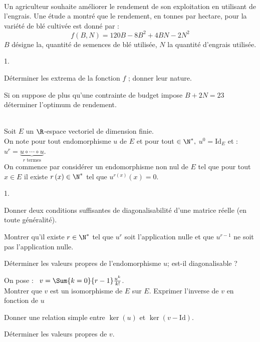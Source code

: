 \documentclass[11pt]{article}%
\begin{document}
\begin{exerciceSP}~\\
  Un agriculteur souhaite améliorer le rendement de son exploitation
  en utilisant de l'engrais. Une étude a montré que le rendement, en
  tonnes par hectare, pour la variété de blé cultivée est donné par :
  \[
  f\left( B,N\right) =120B-8B^{2}+4BN-2N^{2}
  \]
  $B$ désigne la, quantité de semences de blé utilisée, $N$ la
  quantité d'engrais utilisée.
  \begin{noliste}{1.}
    \setlength{\itemsep}{2mm}
  \item Déterminer les extrema de la fonction $f$ ; donner leur
    nature.
  \item Si on suppose de plus qu'une contrainte de budget impose
    $B+2N=23$ déterminer l'optimum de rendement.
  \end{noliste}
\end{exerciceSP}


\newpage


\begin{exerciceAP}~\\
  Soit $E$ un $\R$-espace vectoriel de dimension finie.\\
  On note pour tout endomorphisme $u$ de $E$ et pour tout $\in
  \N^{\ast },$ $u^{0}= \mathrm{Id}_{E}$ et : \
  $u^{r} = \underset{r\text{ termes}}{\underbrace{u\circ \cdots \circ
      u}}$.\\[.2cm]
  On commence par considérer un endomorphisme non nul de $E$ tel que
  pour tout $x\in E$ il existe $r\left( x\right) \in \N^{\ast }$ tel
  que $u^{r\left( x\right) }(x) = 0$.
  \begin{noliste}{1.}
    \setlength{\itemsep}{2mm}
  \item Donner deux conditions suffisantes de diagonalisabilité d'une
    matrice réelle (en toute généralité).

  \item Montrer qu'il existe $r\in \N^{\ast }$ tel que $u^{r}$ soit
    l'application nulle et que $u^{r-1}$ ne soit pas l'application
    nulle.

  \item Déterminer les valeurs propres de l'endomorphisme $u$; est-il
    diagonalisable ?

  \item On pose : \ $v=\Sum{k=0}{r-1}\frac{u^{k}}{k!}$.\\
    Montrer que $v$ est un isomorphisme de $E$ sur $E$. Exprimer
    l'inverse de $v$ en fonction de $u$

  \item Donner une relation simple entre $\ker \left( u\right) $ et
    $\ker \left( v-\mathrm{Id}\right)$.

  \item Déterminer les valeurs propres de $v$.
  \end{noliste}
\end{exerciceAP}
\end{document}
